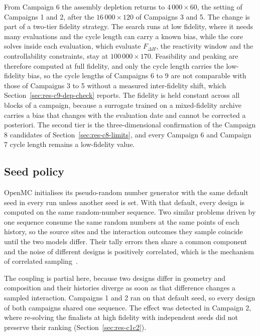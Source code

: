 From Campaign 6 the assembly depletion returns to $4\,000\times60$,
the setting of Campaigns 1 and 2, after the $16\,000\times120$ of
Campaigns 3 and 5. The change is part of a two-tier fidelity strategy. The search runs at low fidelity,
where it needs many evaluations and the cycle length can carry a known
bias, while the core solves inside each evaluation, which evaluate
$F_{\Delta H}$, the reactivity window and the controllability constraints, stay at
$100\,000\times170$. Feasibility and peaking are therefore computed at
full fidelity, and only the cycle length carries the low-fidelity bias,
so the cycle lengths of Campaigns 6 to 9 are not comparable with those
of Campaigns 3 to 5 without a measured inter-fidelity shift, which
Section~\ref{sec:res-c9-dep-check} reports. The fidelity is held
constant across all blocks of a campaign, because a surrogate trained
on a mixed-fidelity archive carries a bias that changes with the
evaluation date and cannot be corrected a posteriori. The second tier
is the three-dimensional confirmation of the Campaign 8 candidates of
Section~\ref{sec:res-c8-limits}, and every Campaign 6 and Campaign 7
cycle length remains a low-fidelity value.

\subsection{Seed policy}
\label{sec:meth-fid-seed}

OpenMC initialises its pseudo-random number generator with the same
default seed in every run unless another seed is set. With that
default, every design is computed on the same random-number sequence.
Two similar problems driven by one sequence consume the same random
numbers at the same points of each history, so the source sites and
the interaction outcomes they sample coincide until the two models
differ. Their tally errors then share a common component and the noise
of different designs is positively correlated, which is the mechanism
of correlated sampling~\cite{lux_koblinger_1991}.

The coupling is partial
here, because two designs differ in geometry and composition and their
histories diverge as soon as that difference changes a sampled
interaction. Campaigns 1 and 2 ran on that default seed, so every
design of both campaigns shared one sequence. The effect was detected
in Campaign 2, where re-solving the finalists at high fidelity with
independent seeds did not preserve their ranking
(Section~\ref{sec:res-c1c2}).

